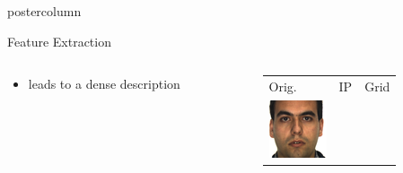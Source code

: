 \documentclass[final,hyperref={pdfpagelabels=false}]{beamer}
\begin{document}
\begin{frame}
\begin{columns}
\begin{column}{.33\textwidth}
\begin{beamercolorbox}[center,wd=\textwidth]{postercolumn}
\begin{minipage}[T]{.95\textwidth}
{\begin{block}{Feature Extraction}
\begin{columns}
\begin{column}{.55\textwidth}
\begin{itemize}
\begin{itemize}
                    \item leads to a \alert{dense} description
                    \end{itemize}
                  \end{itemize}
                \end{column}
                \begin{column}{.44\textwidth}
                  \centering
                  \begin{tabularx}{\linewidth}{ZZZ}
                     Orig.
                     &
                     IP
                     &
                     Grid
                     \\
                    \includegraphics[width=0.95\linewidth]{images/viola/m-012-1.png}
                    &

\end{tabularx}
\end{column}
\end{columns}
\end{block}}
\end{minipage}
\end{beamercolorbox}
\end{column}
\end{columns}
\end{frame}
\end{document}
